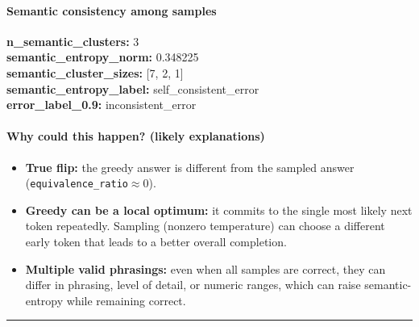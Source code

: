 \documentclass[11pt]{article}
\newcommand{\mono}[1]{\texttt{#1}}
\begin{document}
\paragraph{Semantic consistency among samples}
\textbf{n\_semantic\_clusters:} 3\\
\textbf{semantic\_entropy\_norm:} 0.348225\\
\textbf{semantic\_cluster\_sizes:} [7, 2, 1]\\
\textbf{semantic\_entropy\_label:} self\_consistent\_error\\
\textbf{error\_label\_0.9:} inconsistent\_error\\
\paragraph{Why could this happen? (likely explanations)}
\begin{itemize}
\item \textbf{True flip:} the greedy answer is different from the sampled answer (\mono{equivalence\_ratio}$\approx 0$).
\item \textbf{Greedy can be a local optimum:} it commits to the single most likely next token repeatedly. Sampling (nonzero temperature) can choose a different early token that leads to a better overall completion.
\item \textbf{Multiple valid phrasings:} even when all samples are correct, they can differ in phrasing, level of detail, or numeric ranges, which can raise semantic-entropy while remaining correct.
\end{itemize}
\vspace{10pt}
\hrule
\vspace{10pt}
\end{document}
